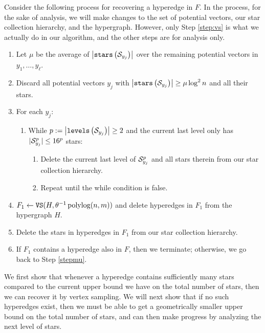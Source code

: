 \documentclass{article}
\begin{document}
Consider the following process for recovering a hyperedge in $F$.
In the process, for the sake of analysis,
we will make changes to the set of potential vectors,
our star collection hierarchy,
and the hypergraph.
However, only Step \ref{step:vs} is what we actually do in our algorithm,
and the other steps are for analysis only.
\begin{enumerate}
        \item Let $\mu$ be the average of $\left|\mathtt{stars}\left(\mathcal{S}_{y_j}\right) \right|$ over
        the remaining potential vectors in $y_1,\ldots,y_{\ell}$. \label{stepmu}
        \item Discard all potential vectors $y_j$ with
        $\left|\mathtt{stars}\left(\mathcal{S}_{y_j}\right) \right| \geq \mu \log^2 n$ and all their stars. \label{step:discard}
        \item For each $y_j$:
        \begin{enumerate}
            \item While $p:=\left|\mathtt{levels}\left(\mathcal{S}_{y_j}\right) \right| \geq 2$
        and the current last level only has
        $|\mathcal{S}_{y_j}^p| \leq 16^p$ stars:
            \begin{enumerate}
                \item Delete the current last level of $\mathcal{S}^p_{y_j}$
                and all stars therein from our star collection hierarchy. 
                \item Repeat until the while condition is false.
            \end{enumerate}
        \end{enumerate}
        \item $F_1\gets \mathtt{VS}(H, \theta^{-1}\operatorname{polylog}(n,m))$ and delete hyperedges in $F_1$ from the hypergraph $H$. \label{step:vs}
        \item Delete the stars in hyperedges in $F_1$ from our star collection hierarchy.
        \item If $F_1$ contains a hyperedge also in $F$, then we terminate;
        otherwise, we go back to Step \ref{stepmu}.
\end{enumerate}

We first show that whenever a hyperedge contains sufficiently many stars
compared to the current upper bound we have on the total number of stars,
then we can recover it by vertex sampling.
We will next show that if no such hyperedges exist, then
we must be able to get a geometrically smaller upper bound
on the total number of stars, and can then make progress by analyzing the next level of stars. 
\end{document}
